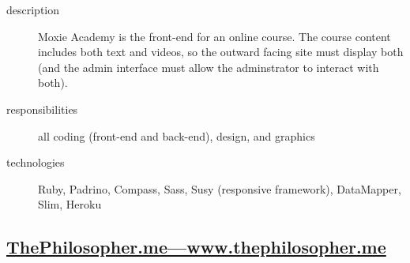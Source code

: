 \documentclass{article}
\begin{document}
\begin{multicols}{2}

\begin{description}
  \item[description] Moxie Academy is the front-end for an online 
    course.  The course content includes both text and videos, so the 
    outward facing site must display both (and the admin interface 
    must allow the adminstrator to interact with both).
  \item[responsibilities] all coding (front-end and back-end), design, and graphics
  \item[technologies] Ruby, Padrino, Compass, Sass, Susy (responsive framework), DataMapper, Slim, Heroku
\end{description}

\vfill
\columnbreak
{}
\end{multicols}


\subsection{\href{http://www.thephilosopher.me}
  {ThePhilosopher.me---www.thephilosopher.me}}
\label{sub:ThePhilosopher}
\end{document}

